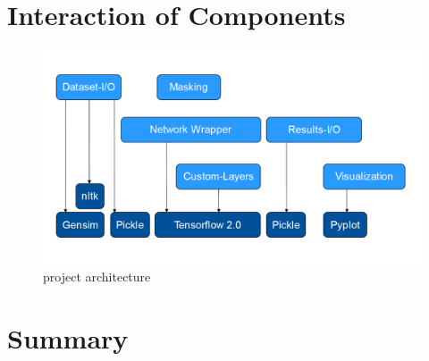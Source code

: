 \section{Interaction of Components}
\begin{figure}[H]
	\centering
	\includegraphics[width=450px]{gfx/structure2.png}
	\caption{project architecture}
	\label{fig:Interaction}
\end{figure}


\section{Summary}